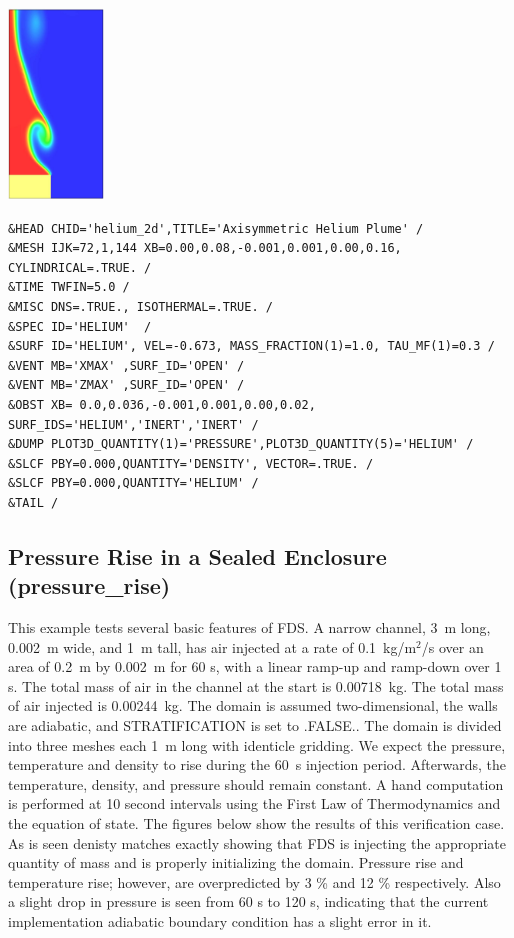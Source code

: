 \documentclass[11pt]{book}
\begin{document}
\vspace{0.2in}
\scriptsize
\noindent
\begin{minipage}{1.1in}
\includegraphics[height=2in]{FIGURES/helium_2d}
\end{minipage}
\hfill
\begin{minipage}{5.5in}
\begin{verbatim}
&HEAD CHID='helium_2d',TITLE='Axisymmetric Helium Plume' /
&MESH IJK=72,1,144 XB=0.00,0.08,-0.001,0.001,0.00,0.16, CYLINDRICAL=.TRUE. /
&TIME TWFIN=5.0 /
&MISC DNS=.TRUE., ISOTHERMAL=.TRUE. /
&SPEC ID='HELIUM'  /
&SURF ID='HELIUM', VEL=-0.673, MASS_FRACTION(1)=1.0, TAU_MF(1)=0.3 /
&VENT MB='XMAX' ,SURF_ID='OPEN' /
&VENT MB='ZMAX' ,SURF_ID='OPEN' /
&OBST XB= 0.0,0.036,-0.001,0.001,0.00,0.02, SURF_IDS='HELIUM','INERT','INERT' /
&DUMP PLOT3D_QUANTITY(1)='PRESSURE',PLOT3D_QUANTITY(5)='HELIUM' /
&SLCF PBY=0.000,QUANTITY='DENSITY', VECTOR=.TRUE. /
&SLCF PBY=0.000,QUANTITY='HELIUM' /
&TAIL /
\end{verbatim}
\end{minipage}
\normalsize


\clearpage

\subsection{Pressure Rise in a Sealed Enclosure ({\bf pressure\_rise})  }

This example tests several basic features of FDS. A narrow channel, 3~m long, 0.002~m wide, and 1~m tall, has air injected at a rate of
0.1~kg/m$^2$/s over an area of 0.2~m by 0.002~m for 60 s, with a linear ramp-up and ramp-down over 1 s. The total mass of air in the channel at the start
is 0.00718~kg. The total mass of air injected is 0.00244~kg.
The domain is assumed two-dimensional, the walls are adiabatic, and {\ct STRATIFICATION} is set to {\ct .FALSE.}. The domain is divided into three
meshes each 1~m long with identicle gridding.  We expect the pressure,
 temperature and density to rise during the 60~s injection period. Afterwards, the
temperature, density, and pressure should remain constant. A hand computation is performed at 10 second intervals using the First Law of
Thermodynamics and the equation of state.  The figures below show the results of this verification case.  As is seen denisty
matches exactly showing that FDS is injecting the appropriate quantity of mass and is properly initializing the domain.
Pressure rise and temperature rise; however, are overpredicted by 3 \% and 12 \% respectively.  Also a slight drop in pressure
is seen from 60 s to 120 s, indicating that the current implementation adiabatic boundary condition has a slight error in it.
\end{document}
